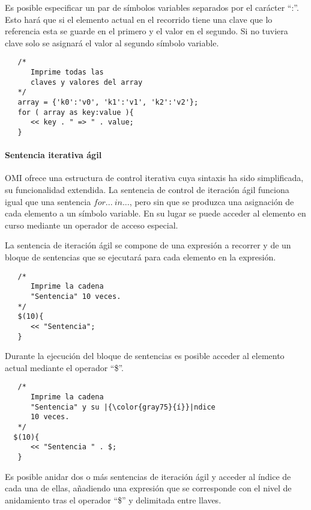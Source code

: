 Es posible especificar un par de símbolos variables separados por el carácter ``:''. Esto hará que si el elemento actual en el recorrido tiene una clave que lo referencia esta se guarde en 
el primero y el valor en el segundo. Si no tuviera clave solo se asignará el valor al segundo símbolo variable. \\


\begin{lstlisting}
   /*
      Imprime todas las 
      claves y valores del array
   */
   array = {'k0':'v0', 'k1':'v1', 'k2':'v2'};
   for ( array as key:value ){
      << key . " => " . value; 
   }
\end{lstlisting}

\paragraph{Sentencia iterativa ágil} \label{sec:stmt_agil}

OMI ofrece una estructura de control iterativa cuya sintaxis ha sido simplificada, su funcionalidad extendida. La sentencia de control de iteración ágil funciona
igual que una sentencia $for...\ in...$, pero sin que se produzca una asignación de cada elemento a un símbolo variable. En su lugar se puede acceder al elemento 
en curso mediante un operador de acceso especial.

La sentencia de iteración ágil se compone de una expresión a recorrer y de un bloque de sentencias que se ejecutará para cada elemento en la expresión. \\

\begin{lstlisting}
   /*
      Imprime la cadena 
      "Sentencia" 10 veces.
   */
   $(10){
      << "Sentencia"; 
   }
\end{lstlisting}

Durante la ejecución del bloque de sentencias es posible acceder al elemento actual mediante el operador ``\$''. \\

\begin{lstlisting}
   /*
      Imprime la cadena 
      "Sentencia" y su |{\color{gray75}{í}}|ndice 
      10 veces.
   */
  $(10){
      << "Sentencia " . $; 
   }
\end{lstlisting}

Es posible anidar dos o más sentencias de iteración ágil y acceder al índice de cada una de ellas, añadiendo una expresión que se corresponde con el nivel de
anidamiento tras el operador ``\$'' y delimitada entre llaves. \\


